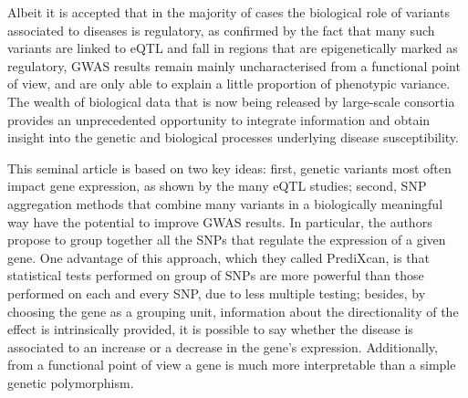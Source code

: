\documentclass[../main.tex]{subfiles}
\begin{document}
Albeit it is accepted that in the majority of cases the biological role 
of variants associated to diseases is regulatory, as confirmed by the 
fact that many such variants are linked to eQTL and fall in regions that 
are epigenetically marked as regulatory, GWAS results remain mainly 
uncharacterised from a functional point of view, and are only able to 
explain a little proportion of phenotypic variance. The wealth of 
biological data that is now being released by large-scale consortia 
provides an unprecedented opportunity to integrate information and 
obtain insight into the genetic and biological processes underlying 
disease susceptibility.

This seminal article is based on two key ideas: first, genetic variants 
most often impact gene expression, as shown by the many eQTL studies; 
second, SNP aggregation methods that combine many variants in a 
biologically meaningful way have the potential to improve GWAS results. 
In particular, the authors propose to group together all the SNPs that 
regulate the expression of a given gene. One advantage of this approach, 
which they called PrediXcan, is that statistical tests performed on 
group of SNPs are more powerful than those performed on each and every 
SNP, due to less multiple testing; besides, by choosing the gene as a 
grouping unit, information about the directionality of the effect is 
intrinsically provided, \ie it is possible to say whether the disease is 
associated to an increase or a decrease in the gene's expression. 
Additionally, from a functional point of view a gene is much more 
interpretable than a simple genetic polymorphism.
\end{document}
